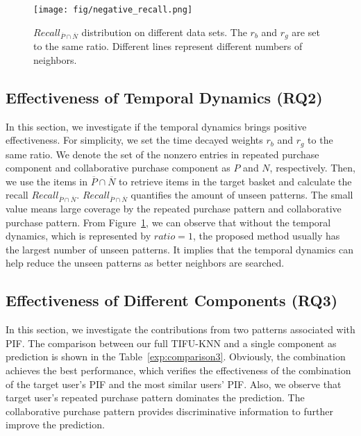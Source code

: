 \documentclass[sigconf]{acmart}
\begin{document}
\begin{figure}[!t]
\centerline{\texttt{[image: fig/negative\_recall.png]}}
\caption{$Recall_{\overline{P}\cap \overline{N}}$ distribution on different data sets. The $r_b$ and $r_g$ are set to the same ratio. Different lines represent different numbers of neighbors.}
\label{fig:neg_recall}
\end{figure}

\subsection{Effectiveness of Temporal Dynamics (RQ2)}

In this section, we  investigate if the temporal  dynamics brings positive effectiveness. For  simplicity, we set the time decayed weights $r_b$ and $r_g$ to the same ratio. We  denote the set of the nonzero entries in repeated purchase component and collaborative purchase component as $P$ and $N$, respectively. Then, we use  the items in $\overline{P} \cap \overline{N}$ to retrieve items in the target basket and calculate the recall $Recall_{\overline{P}\cap \overline{N}}$. $Recall_{\overline{P}\cap \overline{N}}$ quantifies  the amount of unseen patterns. The small value  means large coverage by the repeated purchase pattern and collaborative purchase pattern. From 
Figure~\ref{fig:neg_recall}, we can observe that without the temporal dynamics, which is represented by $ratio=1$,  the proposed method usually has the largest number of unseen patterns. It implies that the temporal dynamics can help reduce the unseen patterns as better neighbors are searched.




\subsection{Effectiveness of Different Components (RQ3)}
In this section, we investigate the  contributions from two patterns associated with PIF.  The  comparison between  our full TIFU-KNN and a single component as prediction is shown in the Table~\ref{exp:comparison3}. Obviously, the combination achieves the best performance, which verifies the effectiveness of the  combination of  the target user's  PIF and  the most similar users' PIF. Also, we  observe that target user's repeated purchase  pattern dominates the  prediction. The  collaborative  purchase pattern provides   discriminative information to further improve the prediction. 
\end{document}
